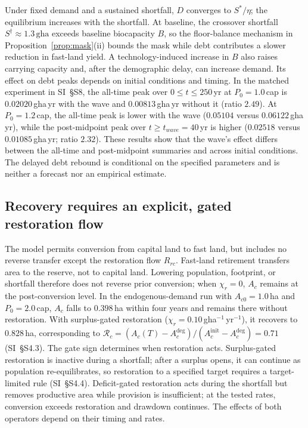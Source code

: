 \documentclass[preprint,12pt,authoryear]{elsarticle}
\begin{document}
Under fixed demand and a sustained shortfall, $D$ converges to $S^*/\eta$; the equilibrium increases with the shortfall. At baseline, the crossover shortfall $S^\dagger\approx1.3\,\mathrm{gha}$ exceeds baseline biocapacity $B$, so the floor-balance mechanism in Proposition~\ref{prop:mask}(ii) bounds the mask while debt contributes a slower reduction in fast-land yield. A technology-induced increase in $B$ also raises carrying capacity and, after the demographic delay, can increase demand. Its effect on debt peaks depends on initial conditions and timing. In the matched experiment in SI~\S S8, the all-time peak over $0\le t\le250$\,yr at $P_0=1.0$\,cap is $0.02020$\,gha\,yr with the wave and $0.00813$\,gha\,yr without it (ratio $2.49$). At $P_0=1.2$\,cap, the all-time peak is lower with the wave ($0.05104$ versus $0.06122$\,gha\,yr), while the post-midpoint peak over $t\ge t_{wave}=40$\,yr is higher ($0.02518$ versus $0.01085$\,gha\,yr; ratio $2.32$). These results show that the wave's effect differs between the all-time and post-midpoint summaries and across initial conditions. The delayed debt rebound is conditional on the specified parameters and is neither a forecast nor an empirical estimate.

\subsection{Recovery requires an explicit, gated restoration flow}\label{sec:recovery}

The model permits conversion from capital land to fast land, but includes no reverse transfer except the restoration flow $R_{rc}$. Fast-land retirement transfers area to the reserve, not to capital land. Lowering population, footprint, or shortfall therefore does not reverse prior conversion; when $\chi_r=0$, $A_c$ remains at the post-conversion level. In the endogenous-demand run with $A_{c0}=1.0$\,ha and $P_0=2.0$\,cap, $A_c$ falls to $0.398$\,ha within four years and remains there without restoration. With surplus-gated restoration ($\chi_r=0.10$\,gha$^{-1}$\,yr$^{-1}$), it recovers to $0.828$\,ha, corresponding to $\mathcal R_c=(A_c(T)-A_c^{\mathrm{deg}})/(A_c^{\mathrm{init}}-A_c^{\mathrm{deg}})=0.71$ (SI~\S S4.3). The gate sign determines when restoration acts. Surplus-gated restoration is inactive during a shortfall; after a surplus opens, it can continue as population re-equilibrates, so restoration to a specified target requires a target-limited rule (SI~\S S4.4). Deficit-gated restoration acts during the shortfall but removes productive area while provision is insufficient; at the tested rates, conversion exceeds restoration and drawdown continues. The effects of both operators depend on their timing and rates.
\end{document}
